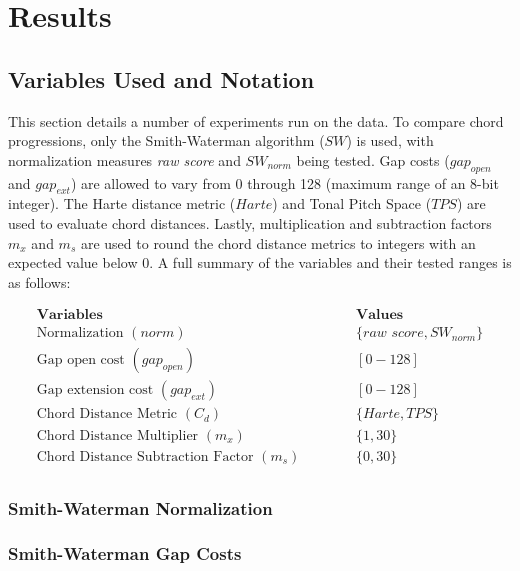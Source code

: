 \chapter{Results}

\section{Variables Used and Notation}

This section details a number of experiments run on the data. To compare chord progressions, only the Smith-Waterman algorithm ($SW$) is used, with normalization measures \textit{raw score} and ${SW}_{norm}$ being tested. Gap costs (${gap}_{open}$ and ${gap}_{ext}$) are allowed to vary from 0 through 128 (maximum range of an 8-bit integer). The Harte distance metric ($Harte$) and Tonal Pitch Space ($TPS$) are used to evaluate chord distances. Lastly, multiplication and subtraction factors $m_x$ and $m_s$ are used to round the chord distance metrics to integers with an expected value below 0. A full summary of the variables and their tested ranges is as follows:

\begin{align*}
\textbf{Variables}                       & \hspace{1cm} & \textbf{Values} \\
\text{Normalization } (norm)                    && \{\textit{raw score},{SW}_{norm}\} \\
\text{Gap open cost } ({gap}_{open})                    && [0-128] \\
\text{Gap extension cost } ({gap}_{ext})                && [0-128] \\
\text{Chord Distance Metric } (C_d)            && \{Harte, TPS\} \\
\text{Chord Distance Multiplier } (m_x)       && \{1, 30\} \\
\text{Chord Distance Subtraction Factor } (m_s) && \{0, 30\} \\
\end{align*}

\subsection{Smith-Waterman Normalization}

\subsection{Smith-Waterman Gap Costs}

